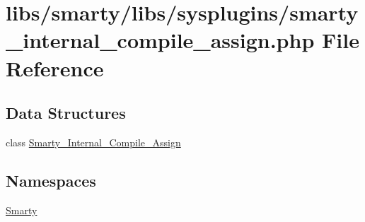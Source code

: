 \hypertarget{smarty__internal__compile__assign_8php}{}\section{libs/smarty/libs/sysplugins/smarty\+\_\+internal\+\_\+compile\+\_\+assign.php File Reference}
\label{smarty__internal__compile__assign_8php}
\subsection*{Data Structures}
\begin{DoxyCompactItemize}
\item 
class \hyperlink{class_smarty___internal___compile___assign}{Smarty\+\_\+\+Internal\+\_\+\+Compile\+\_\+\+Assign}
\end{DoxyCompactItemize}
\subsection*{Namespaces}
\begin{DoxyCompactItemize}
\item 
 \hyperlink{namespace_smarty}{Smarty}
\end{DoxyCompactItemize}
